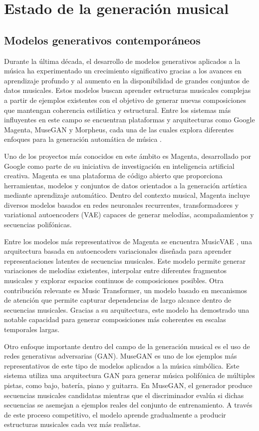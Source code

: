 \documentclass[12pt]{report}
\begin{document}
\section{Estado de la generación musical}
\subsection{Modelos generativos contemporáneos}
Durante la última década, el desarrollo de modelos generativos aplicados a la música ha experimentado un crecimiento significativo gracias a los avances en aprendizaje profundo y al aumento en la disponibilidad de grandes conjuntos de datos musicales. Estos modelos buscan aprender estructuras musicales complejas a partir de ejemplos existentes con el objetivo de generar nuevas composiciones que mantengan coherencia estilística y estructural. Entre los sistemas más influyentes en este campo se encuentran plataformas y arquitecturas como Google Magenta, MuseGAN y Morpheus, cada una de las cuales explora diferentes enfoques para la generación automática de música \cite{roberts2018hierarchical}.

Uno de los proyectos más conocidos en este ámbito es Magenta, desarrollado por Google como parte de su iniciativa de investigación en inteligencia artificial creativa. Magenta es una plataforma de código abierto que proporciona herramientas, modelos y conjuntos de datos orientados a la generación artística mediante aprendizaje automático. Dentro del contexto musical, Magenta \cite{dong2018musegan} incluye diversos modelos basados en redes neuronales recurrentes, transformadores y variational autoencoders (VAE) capaces de generar melodías, acompañamientos y secuencias polifónicas.

Entre los modelos más representativos de Magenta se encuentra MusicVAE \cite{huang2018music}, una arquitectura basada en autoencoders variacionales diseñada para aprender representaciones latentes de secuencias musicales. Este modelo permite generar variaciones de melodías existentes, interpolar entre diferentes fragmentos musicales y explorar espacios continuos de composiciones posibles. Otra contribución relevante es Music Transformer, un modelo basado en mecanismos de atención que permite capturar dependencias de largo alcance dentro de secuencias musicales. Gracias a su arquitectura, este modelo ha demostrado una notable capacidad para generar composiciones más coherentes en escalas temporales largas.

Otro enfoque importante dentro del campo de la generación musical es el uso de redes generativas adversarias (GAN). MuseGAN es uno de los ejemplos más representativos de este tipo de modelos aplicados a la música simbólica. Este sistema utiliza una arquitectura GAN para generar música polifónica de múltiples pistas, como bajo, batería, piano y guitarra. En MuseGAN, el generador produce secuencias musicales candidatas mientras que el discriminador evalúa si dichas secuencias se asemejan a ejemplos reales del conjunto de entrenamiento. A través de este proceso competitivo, el modelo aprende gradualmente a producir estructuras musicales cada vez más realistas.
\end{document}

